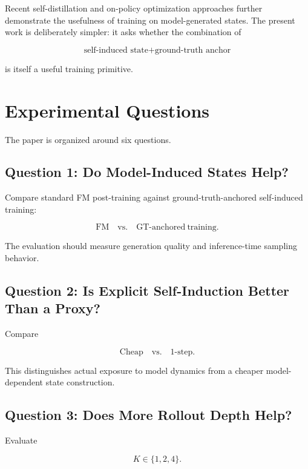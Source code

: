 \documentclass[11pt]{article}
\begin{document}
Recent self-distillation and on-policy optimization approaches further
demonstrate the usefulness of training on model-generated states. The present
work is deliberately simpler: it asks whether the combination of

\begin{equation}
\text{self-induced state}
+
\text{ground-truth anchor}
\end{equation}

is itself a useful training primitive.

\section{Experimental Questions}

The paper is organized around six questions.

\subsection{Question 1: Do Model-Induced States Help?}

Compare standard FM post-training against ground-truth-anchored
self-induced training:

\begin{equation}
\mathrm{FM}
\quad\text{vs.}\quad
\mathrm{GT\text{-}anchored\ training}.
\end{equation}

The evaluation should measure generation quality and inference-time sampling
behavior.

\subsection{Question 2: Is Explicit Self-Induction Better Than a Proxy?}

Compare

\begin{equation}
\mathrm{Cheap}
\quad\text{vs.}\quad
\mathrm{1\text{-}step}.
\end{equation}

This distinguishes actual exposure to model dynamics from a cheaper
model-dependent state construction.

\subsection{Question 3: Does More Rollout Depth Help?}

Evaluate

\begin{equation}
K\in\{1,2,4\}.
\end{equation}
\end{document}
